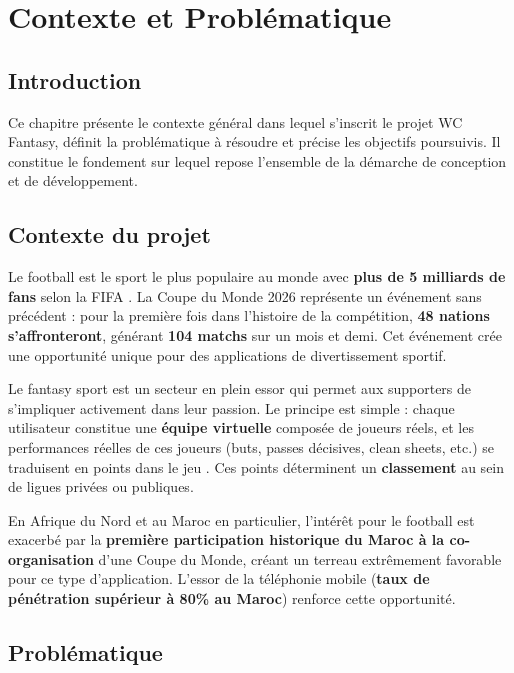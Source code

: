 
\chapter{Contexte et Problématique}

\section*{Introduction}

Ce chapitre présente le contexte général dans lequel s'inscrit le projet WC Fantasy, définit la problématique à résoudre et précise les objectifs poursuivis. Il constitue le fondement sur lequel repose l'ensemble de la démarche de conception et de développement.

\section{Contexte du projet}

Le football est le sport le plus populaire au monde avec \textbf{plus de 5 milliards de fans} selon la FIFA \cite{fifa_wc2026}. La Coupe du Monde 2026 représente un événement sans précédent : pour la première fois dans l'histoire de la compétition, \textbf{48 nations s'affronteront}, générant \textbf{104 matchs} sur un mois et demi. Cet événement crée une opportunité unique pour des applications de divertissement sportif.

Le fantasy sport est un secteur en plein essor qui permet aux supporters de s'impliquer activement dans leur passion. Le principe est simple : chaque utilisateur constitue une \textbf{équipe virtuelle} composée de joueurs réels, et les performances réelles de ces joueurs (buts, passes décisives, clean sheets, etc.) se traduisent en points dans le jeu \cite{statista_fantasy}. Ces points déterminent un \textbf{classement} au sein de ligues privées ou publiques.

En Afrique du Nord et au Maroc en particulier, l'intérêt pour le football est exacerbé par la \textbf{première participation historique du Maroc à la co-organisation} d'une Coupe du Monde, créant un terreau extrêmement favorable pour ce type d'application. L'essor de la téléphonie mobile (\textbf{taux de pénétration supérieur à 80\% au Maroc}) renforce cette opportunité.

\section{Problématique}

